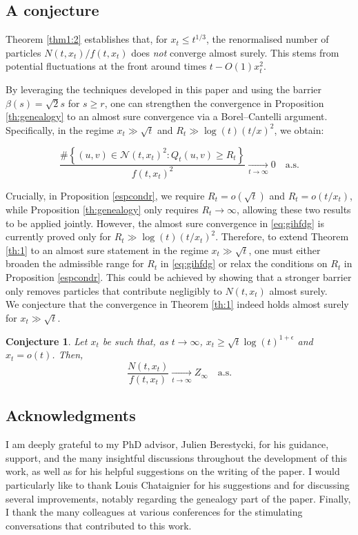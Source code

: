 \documentclass{article}
\newtheorem{conjecture}[theorem]{Conjecture}
\begin{document}
\subsection{A conjecture}

Theorem \ref{thm1:2} establishes that, for $x_t \leq t^{1/3}$, the renormalised number of particles $N(t,x_t)/f(t,x_t)$ does \emph{not} converge almost surely. This stems from potential fluctuations at the front around times \( t - O(1) x_t^2 \).


By leveraging the techniques developed in this paper and using the barrier $\beta(s) = \sqrt{2}s$ for $s \geq r$, one can strengthen the convergence in Proposition \ref{th:genealogy} to an almost sure convergence via a Borel–Cantelli argument. Specifically, in the regime \( x_t \gg \sqrt{t} \) and \( R_t \gg \log(t)(t/x)^2 \), we obtain:

\begin{equation}\label{eq:gihfdg}
   \frac{\#\left\{(u,v) \in \mathcal{N}(t,x_t)^2 : Q_t(u,v) \geq R_t \right\}}{f(t,x_t)^2} \xrightarrow[t\to \infty]{} 0 \quad \text{a.s.}
\end{equation}


Crucially, in Proposition \ref{espcondr}, we require \( R_t = o(\sqrt{t}) \) and \( R_t = o(t/x_t) \), while Proposition \ref{th:genealogy} only requires \( R_t \to \infty \), allowing these two results to be applied jointly. However, the almost sure convergence in \eqref{eq:gihfdg} is currently proved only for \( R_t \gg \log(t)(t/x_t)^2 \). Therefore, to extend Theorem \ref{th:1} to an almost sure statement in the regime \( x_t \gg \sqrt{t} \), one must either broaden the admissible range for \( R_t \) in \eqref{eq:gihfdg} or relax the conditions on \( R_t \)  in Proposition \ref{espcondr}. This could be achieved by showing that a stronger barrier only removes particles that contribute negligibly to $N(t,x_t)$ almost surely.\\


We conjecture that the convergence in Theorem \ref{th:1} indeed holds almost surely for $x_t \gg \sqrt{t}$.
\begin{conjecture}
Let $x_t$ be such that, as $t \to \infty$, $x_t \geq \sqrt{t} \log(t)^{1+\epsilon}$ and $x_t = o(t)$. Then,
\begin{equation}
  \frac{N(t,x_t)}{f(t,x_t)} \xrightarrow[t \to \infty]{} Z_\infty \quad \text{a.s.}
\end{equation}
\end{conjecture}

\subsection{Acknowledgments}
I am deeply grateful to my PhD advisor, Julien Berestycki, for his guidance, support, and the many insightful discussions throughout the development of this work, as well as for his helpful suggestions on the writing of the paper. I would particularly like to thank Louis Chataignier for his suggestions and for discussing several improvements, notably regarding the genealogy part of the paper. Finally, I thank the many colleagues at various conferences for the stimulating conversations that contributed to this work.
\end{document}

